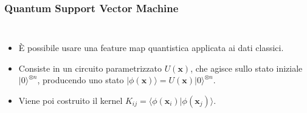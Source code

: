 \documentclass{beamer}
\begin{document}
\begin{frame}

  \frametitle{Quantum Support Vector Machine}
  
  \begin{columns}
  
    \begin{itemize}
      \item<1-> È possibile usare una feature map quantistica applicata ai dati classici. 
          \item<2-> Consiste in un circuito parametrizzato $U(\mathbf{x})$, che agisce sullo stato iniziale $|0\rangle^{\otimes n}$, producendo uno stato $|\phi(\mathbf{x})\rangle=U(\mathbf{x})|0\rangle^{\otimes n}$.
          \item<3-> Viene poi costruito il kernel $K_{ij}=\langle \phi(\mathbf{x}_i)| \phi(\mathbf{x}_j) \rangle.$
          \end{itemize}
    

\end{columns}
\end{frame}
\end{document}
